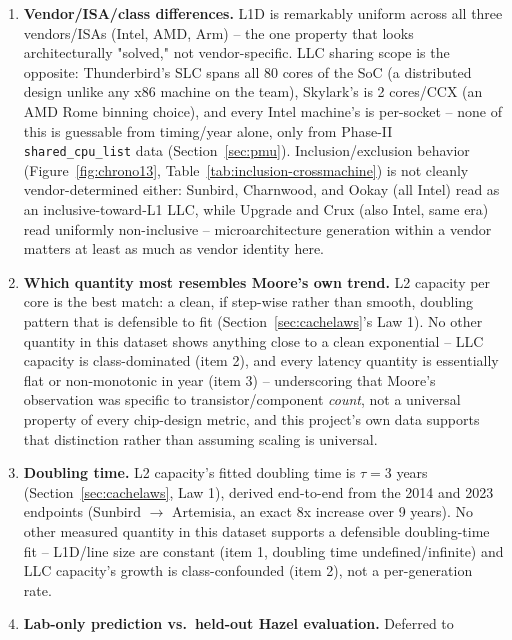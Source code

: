 \documentclass{article}
\begin{document}
\begin{enumerate}
    technology/NUMA/server-vs-desktop platform differences more than CPU generation
    (Section~\ref{sec:evolution} treats DRAM latency explicitly as a system-level, not
    CPU-only).
    \item \textbf{Vendor/ISA/class differences.} L1D is remarkably uniform across all three
    vendors/ISAs (Intel, AMD, Arm) -- the one property that looks architecturally
    "solved," not vendor-specific. LLC sharing scope is the opposite: Thunderbird's SLC
    spans all 80 cores of the SoC (a distributed design unlike any x86 machine on the team),
    Skylark's is 2 cores/CCX (an AMD Rome binning choice), and every Intel machine's is
    per-socket -- none of this is guessable from timing/year alone, only from
    Phase-II \texttt{shared\_cpu\_list} data (Section~\ref{sec:pmu}). Inclusion/exclusion
    behavior (Figure~\ref{fig:chrono13}, Table~\ref{tab:inclusion-crossmachine}) is not
    cleanly vendor-determined either: Sunbird, Charnwood, and Ookay (all Intel) read as an
    inclusive-toward-L1 LLC, while Upgrade and Crux (also Intel, same era) read uniformly
    non-inclusive -- microarchitecture generation within a vendor matters at least as much as
    vendor identity here.
    \item \textbf{Which quantity most resembles Moore's own trend.} L2 capacity per core is
    the best match: a clean, if step-wise rather than smooth, doubling pattern that is
    defensible to fit (Section~\ref{sec:cachelaws}'s Law 1). No other quantity in this dataset
    shows anything close to a clean exponential -- LLC capacity is class-dominated (item 2),
    and every latency quantity is essentially flat or non-monotonic in year (item 3) --
    underscoring that Moore's observation was specific to transistor/component \emph{count},
    not a universal property of every chip-design metric, and this project's own data
    supports that distinction rather than assuming scaling is universal.
    \item \textbf{Doubling time.} L2 capacity's fitted doubling time is $\tau=3$ years
    (Section~\ref{sec:cachelaws}, Law 1), derived end-to-end from the 2014 and 2023
    endpoints (Sunbird $\to$ Artemisia, an exact 8x increase over 9 years). No other measured
    quantity in this dataset supports a defensible doubling-time fit -- L1D/line size are
    constant (item 1, doubling time undefined/infinite) and LLC capacity's growth is
    class-confounded (item 2), not a per-generation rate.
    \item \textbf{Lab-only prediction vs.\ held-out Hazel evaluation.} Deferred to

\end{enumerate}
\end{document}
